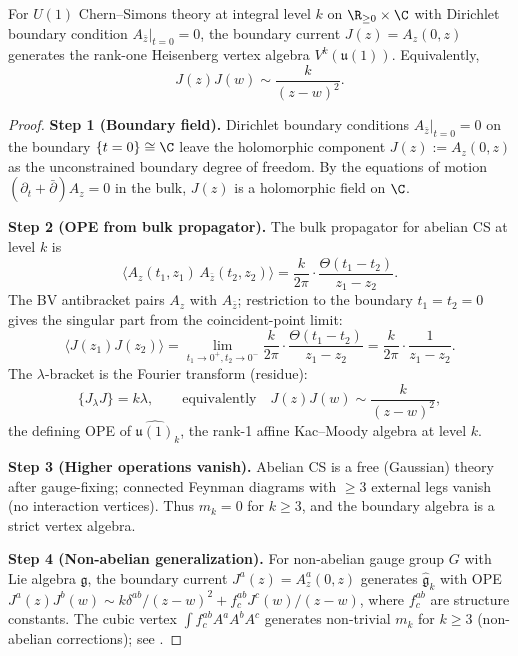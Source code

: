 \begin{theorem}
\label{thm:CS_boundary}
For $U(1)$ Chern--Simons theory at integral level $k$ on
$\R_{\geq 0}\times\C$ with Dirichlet boundary condition
$A_{\bar z}|_{t=0}=0$, the boundary current $J(z)=A_z(0,z)$ generates
the rank-one Heisenberg vertex algebra $V^k(\mathfrak u(1))$.
Equivalently,
\[
J(z)J(w)\sim \frac{k}{(z-w)^2}.
\]
\end{theorem}

\begin{proof}
\textbf{Step 1 (Boundary field).}
Dirichlet boundary conditions $A_{\bar z}|_{t=0} = 0$ on the boundary $\{t=0\} \cong \C$ leave the holomorphic component $J(z) := A_z(0,z)$ as the unconstrained boundary degree of freedom. By the equations of motion $(\partial_t + \bar\partial)A_z = 0$ in the bulk, $J(z)$ is a holomorphic field on $\C$.

\textbf{Step 2 (OPE from bulk propagator).}
The bulk propagator for abelian CS at level $k$ is
\[
\langle A_z(t_1,z_1)\, A_{\bar z}(t_2,z_2) \rangle = \frac{k}{2\pi} \cdot \frac{\Theta(t_1 - t_2)}{z_1 - z_2}.
\]
The BV antibracket pairs $A_z$ with $A_{\bar z}$; restriction to the boundary $t_1 = t_2 = 0$ gives the singular part from the coincident-point limit:
\[
\langle J(z_1) J(z_2) \rangle = \lim_{t_1 \to 0^+, t_2 \to 0^-} \frac{k}{2\pi} \cdot \frac{\Theta(t_1 - t_2)}{z_1 - z_2} = \frac{k}{2\pi} \cdot \frac{1}{z_1 - z_2}.
\]
The $\lambda$-bracket is the Fourier transform (residue):
\begin{equation}
\label{eq:U1_OPE}
\{J_\lambda J\} = k\lambda, \qquad \text{equivalently} \quad J(z) J(w) \sim \frac{k}{(z-w)^2},
\end{equation}
the defining OPE of $\widehat{\mathfrak{u}(1)}_k$, the rank-1 affine Kac--Moody algebra at level $k$.

\textbf{Step 3 (Higher operations vanish).}
Abelian CS is a free (Gaussian) theory after gauge-fixing; connected Feynman diagrams with $\ge 3$ external legs vanish (no interaction vertices). Thus $m_k = 0$ for $k \ge 3$, and the boundary algebra is a strict vertex algebra.

\textbf{Step 4 (Non-abelian generalization).}
For non-abelian gauge group $G$ with Lie algebra $\mathfrak{g}$, the boundary current $J^a(z) = A_z^a(0,z)$ generates $\widehat{\mathfrak{g}}_k$ with OPE $J^a(z) J^b(w) \sim k\delta^{ab}/(z-w)^2 + f^{ab}_c J^c(w)/(z-w)$, where $f^{ab}_c$ are structure constants. The cubic vertex $\int f^{ab}_c A^a A^b A^c$ generates non-trivial $m_k$ for $k \ge 3$ (non-abelian corrections); see \cite{CDG20,KZ25}.
\end{proof}

